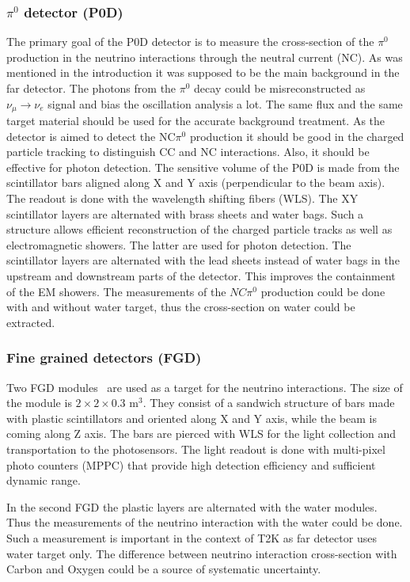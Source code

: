 \documentclass[../main.tex]{subfiles}
\begin{document}
\subsubsection{$\pi^0$ detector (P0D)}
\label{sec:t2k:pod}
The primary goal of the P0D detector is to measure the cross-section of the $\pi^0$ production in the neutrino interactions through the neutral current (NC). As was mentioned in the introduction it was supposed to be the main background in the far detector. The photons from the $\pi^0$ decay could be misreconstructed as $\nu_\mu\to\nu_e$ signal and bias the oscillation analysis a lot. The same flux and the same target material should be used for the accurate background treatment. As the detector is aimed to detect the NC$\pi^0$ production it should be good in the charged particle tracking to distinguish CC and NC interactions. Also, it should be effective for photon detection. The sensitive volume of the P0D is made from the scintillator bars aligned along X and Y axis (perpendicular to the beam axis). The readout is done with the wavelength shifting fibers (WLS). The XY scintillator layers are alternated with brass sheets and water bags. Such a structure allows efficient reconstruction of the charged particle tracks as well as electromagnetic showers. The latter are used for photon detection. The scintillator layers are alternated with the lead sheets instead of water bags in the upstream and downstream parts of the detector. This improves the containment of the EM showers. The measurements of the $NC\pi^0$ production could be done with and without water target, thus the cross-section on water could be extracted.

\subsubsection{Fine grained detectors (FGD)}
Two FGD modules~\cite{Amaudruz2012} are used as a target for the neutrino interactions. The size of the module is $2\times2\times0.3$ $\text{m}^3$. They consist of a sandwich structure of bars made with plastic scintillators and oriented along X and Y axis, while the beam is coming along Z axis. The bars are pierced with WLS for the light collection and transportation to the photosensors. The light readout is done with multi-pixel photo counters (MPPC) that provide high detection efficiency and sufficient dynamic range.

In the second FGD the plastic layers are alternated with the water modules. Thus the measurements of the neutrino interaction with the water could be done. Such a measurement is important in the context of T2K as far detector uses water target only. The difference between neutrino interaction cross-section with Carbon and Oxygen could be a source of systematic uncertainty.
\end{document}

